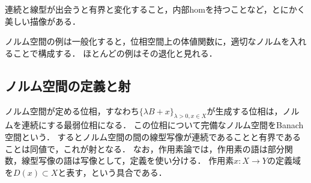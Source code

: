 \documentclass[uplatex,dvipdfmx]{jsreport}
\begin{document}
\begin{tcolorbox}[colframe=ForestGreen, colback=ForestGreen!10!white,breakable,colbacktitle=ForestGreen!40!white,coltitle=black,fonttitle=\bfseries\sffamily,
title=]
    連続と線型が出会うと有界と変化すること，内部homを持つことなど，とにかく美しい描像がある．
    
    ノルム空間の例は一般化すると，位相空間上の体値関数に，適切なノルムを入れることで構成する．
    ほとんどの例はその退化と見れる．
\end{tcolorbox}

\subsection{ノルム空間の定義と射}

\begin{tcolorbox}[colframe=ForestGreen, colback=ForestGreen!10!white,breakable,colbacktitle=ForestGreen!40!white,coltitle=black,fonttitle=\bfseries\sffamily,
title=]
    ノルム空間が定める位相，すなわち$\{\lambda B+x\}_{\lambda>0,x\in X}$が生成する位相は，ノルムを連続にする最弱位相になる．
    この位相について完備なノルム空間をBanach空間という．
    するとノルム空間の間の線型写像が連続であることと有界であることは同値で，これが射となる．
    なお，作用素論では，作用素の語は部分関数，線型写像の語は写像として，定義を使い分ける．
    作用素$x:X\to Y$の定義域を$D(x)\subset X$と表す，という具合である．
\end{tcolorbox}
\end{document}
